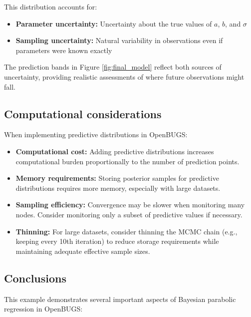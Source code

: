 This distribution accounts for:
\begin{itemize}
\item \textbf{Parameter uncertainty:} Uncertainty about the true values of $a$, $b$, and $\sigma$
\item \textbf{Sampling uncertainty:} Natural variability in observations even if parameters were known exactly
\end{itemize}

The prediction bands in Figure \ref{fig:final_model} reflect both sources of uncertainty, providing realistic assessments of where future observations might fall.

\subsection{Computational considerations}

When implementing predictive distributions in OpenBUGS:
\begin{itemize}
\item \textbf{Computational cost:} Adding predictive distributions increases computational burden proportionally to the number of prediction points.
\item \textbf{Memory requirements:} Storing posterior samples for predictive distributions requires more memory, especially with large datasets.
\item \textbf{Sampling efficiency:} Convergence may be slower when monitoring many nodes. Consider monitoring only a subset of predictive values if necessary.
\item \textbf{Thinning:} For large datasets, consider thinning the MCMC chain (e.g., keeping every 10th iteration) to reduce storage requirements while maintaining adequate effective sample sizes.
\end{itemize}

\subsection{Conclusions}

This example demonstrates several important aspects of Bayesian parabolic regression in OpenBUGS:

